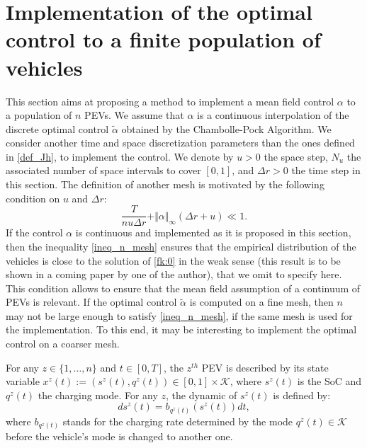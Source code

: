 \documentclass[conference]{IEEEtran}
\def\K{\mathcal{K}}
\begin{document}
\section{Implementation of the optimal control to a finite population of vehicles}
\label{App_alpha_method}

This section aims at proposing a method to implement a mean field control $\alpha$ 
to a population of $n$ PEVs. We assume that $\alpha$ is a continuous interpolation of the discrete optimal control $\tilde{\alpha}$ obtained by the Chambolle-Pock Algorithm.
We consider another time and space discretization parameters than the ones defined in \eqref{def_Jh}, to implement the control. We denote by $u>0$ the space step, $N_u$ the associated number of space intervals to cover $[0,1]$, and $\Delta r>0$ the time step in this section. The definition of another mesh is motivated by the following condition on $u$ and $\Delta r$:
\begin{equation}
\label{ineq_n_mesh}
\frac{T}{nu\Delta r}+\Vert \alpha \Vert_\infty( \Delta r+u) \ll 1.
\end{equation}
If the control $\alpha$ is continuous and implemented as it is proposed in this section, then the inequality \eqref{ineq_n_mesh} ensures that the empirical distribution of the vehicles is close to the solution of \eqref{fk:0} in the weak sense (this result is to be shown in a coming paper by one of the author), that we omit to specify here. 
This condition allows to ensure that the mean field assumption of a continuum of PEVs is relevant. 
If the optimal control $\tilde{\alpha}$ is computed on a fine mesh, then $n$ may not be large enough to satisfy \eqref{ineq_n_mesh}, if the same mesh is used for the implementation. To this end, it may be interesting to implement the optimal control on a coarser mesh.

For any $z\in\{1,\ldots,n\}$ and  $t\in[0,T]$, the $z^{th}$ PEV is described by its state variable $x^z(t):=(s^z(t), q^z(t))\in[0,1]\times \mathcal{K}$, where $s^z(t)$ is the SoC and $q^z(t)$ the charging mode. For any $z$, the dynamic of $s^z(t)$ is defined by:
\begin{equation}
\label{evo_soc}
ds^z(t) = b_{q^z(t)}(s^z(t))dt,
\end{equation}
where $b_{q^z(t)}$ stands for the charging rate determined by the mode $q^z(t)\in\K$ before the vehicle's mode is changed to another one. 
\end{document}
